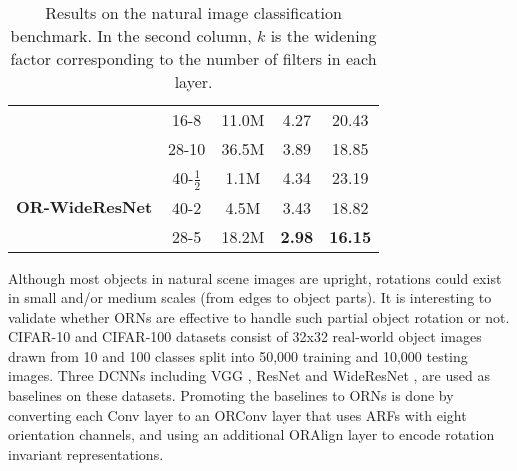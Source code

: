 \documentclass[10pt,twocolumn,letterpaper]{article}
\begin{document}
\begin{table}
\begin{center}
\begin{tabular}{|l|cccc|}
                                                 & 16-8    & 11.0M  & 4.27          & 20.43          \\
                                                 & 28-10   & 36.5M  & 3.89          & 18.85          \\ \hline
                \multirow{4}{*}{\textbf{OR-WideResNet}}  & 40-$\tfrac{1}{2}$    & 1.1M   & 4.34          & 23.19              \\
                                                 & 40-2    & 4.5M   & 3.43          & 18.82          \\
                                                 & 28-5    & 18.2M  & \textbf{2.98} & \textbf{16.15} \\ \hline
        \end{tabular}
        \end{center}
        \caption{
            Results on the natural image classification benchmark. In the second column, $k$ is the widening factor corresponding to the number of filters in each layer.
        }
    \label{tab:CIFAR}
    \vspace{-1em}
    \end{table}

\label{sec:CIFAR}
    Although most objects in natural scene images are upright, rotations could exist in small and/or medium scales (from edges to object parts). It is interesting to validate whether ORNs are effective to handle such partial object rotation or not.
    CIFAR-10 and CIFAR-100 datasets \cite{Krizhevsky2009} consist of 32x32 real-world object images drawn from 10 and 100 classes split into 50,000 training and 10,000 testing images. Three DCNNs including VGG \cite{Simonyan2014}, ResNet \cite{He2015} and WideResNet \cite{Zagoruyko2016}, are used as baselines on these datasets. Promoting the baselines to ORNs is done by converting each Conv layer to an ORConv layer that uses ARFs with eight orientation channels, and using an additional ORAlign layer to encode rotation invariant representations.
\end{document}
